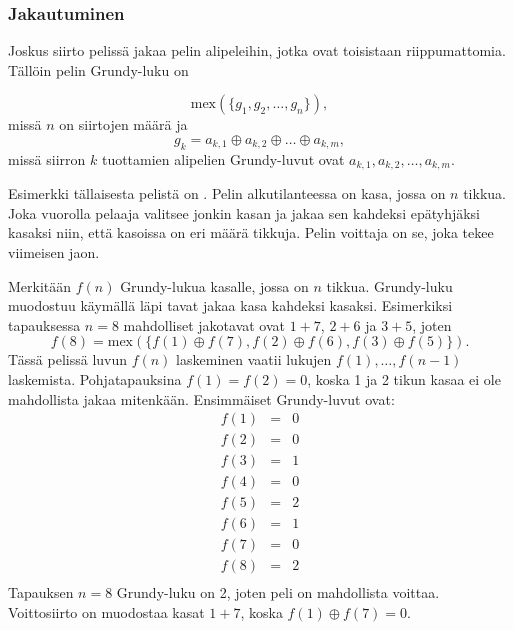\subsubsection{Jakautuminen}

Joskus siirto pelissä jakaa pelin alipeleihin,
jotka ovat toisistaan riippumattomia.
Tällöin pelin Grundy-luku on

\[\textrm{mex}(\{g_1, g_2, \ldots, g_n \}),\]
missä $n$ on siirtojen määrä ja
\[g_k = a_{k,1} \oplus a_{k,2} \oplus \ldots \oplus a_{k,m},\]
missä siirron $k$ tuottamien alipelien
Grundy-luvut ovat $a_{k,1},a_{k,2},\ldots,a_{k,m}$.


Esimerkki tällaisesta pelistä on .
Pelin alkutilanteessa on kasa, jossa on $n$ tikkua.
Joka vuorolla pelaaja valitsee jonkin kasan
ja jakaa sen kahdeksi epätyhjäksi kasaksi
niin, että kasoissa on eri määrä tikkuja.
Pelin voittaja on se, joka tekee viimeisen jaon.

Merkitään $f(n)$ Grundy-lukua kasalle,
jossa on $n$ tikkua.
Grundy-luku muodostuu käymällä läpi tavat
jakaa kasa kahdeksi kasaksi.
Esimerkiksi tapauksessa $n=8$ mahdolliset jakotavat
ovat $1+7$, $2+6$ ja $3+5$, joten
\[f(8)=\textrm{mex}(\{f(1) \oplus f(7), f(2) \oplus f(6), f(3) \oplus f(5)\}).\]
Tässä pelissä luvun $f(n)$ laskeminen vaatii lukujen
$f(1),\ldots,f(n-1)$ laskemista.
Pohjatapauksina $f(1)=f(2)=0$, koska 1 ja 2 tikun
kasaa ei ole mahdollista jakaa mitenkään.
Ensimmäiset Grundy-luvut ovat:
\[
\begin{array}{lcl}
f(1) & = & 0 \\
f(2) & = & 0 \\
f(3) & = & 1 \\
f(4) & = & 0 \\
f(5) & = & 2 \\
f(6) & = & 1 \\
f(7) & = & 0 \\
f(8) & = & 2 \\
\end{array}
\]
Tapauksen $n=8$ Grundy-luku on 2, joten peli on mahdollista
voittaa.
Voittosiirto on muodostaa kasat $1+7$,
koska $f(1) \oplus f(7) = 0$.